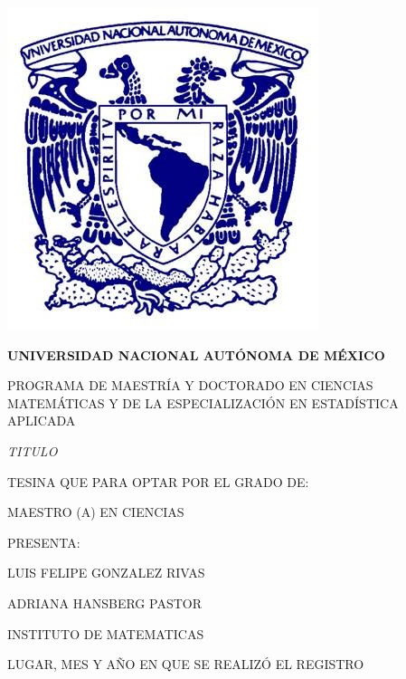 \thispagestyle{empty}
\centering
\includegraphics[scale=0.5]{logo-unam.jpg}

\begin{center}
    \LARGE \textbf{UNIVERSIDAD NACIONAL AUTÓNOMA DE MÉXICO}
    \vspace{0.2cm}
   
    \Large PROGRAMA DE MAESTRÍA Y DOCTORADO EN CIENCIAS MATEMÁTICAS Y DE LA ESPECIALIZACIÓN EN ESTADÍSTICA APLICADA
    \vspace{3.0cm}

    \Large \textit{TITULO}
    \vspace{1.2cm}

    \Large TESINA QUE PARA OPTAR POR EL GRADO DE:
    
    MAESTRO (A) EN CIENCIAS
    \vspace{1.2cm}

    \Large PRESENTA:
    
    LUIS FELIPE GONZALEZ RIVAS
    \vspace{1.5cm}

    \Large ADRIANA HANSBERG PASTOR
    
    INSTITUTO DE MATEMATICAS  %
    \vspace{1.5cm}

    \Large LUGAR, MES Y AÑO EN QUE SE REALIZÓ EL REGISTRO
\end{center}
\newpage
